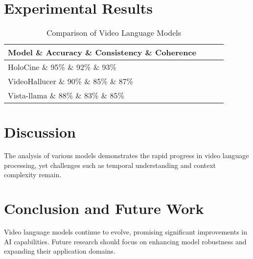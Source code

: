 \documentclass{article}
\begin{document}
\section{Experimental Results}
\begin{table}[h]
\centering
\caption{Comparison of Video Language Models}
\begin{tabular}{lccc}
\toprule
Model \& Accuracy \& Consistency \& Coherence \\
\midrule
HoloCine \& 95\% \& 92\% \& 93\% \\
VideoHallucer \& 90\% \& 85\% \& 87\% \\
Vista-llama \& 88\% \& 83\% \& 85\% \\
\bottomrule
\end{tabular}
\end{table}
\section{Discussion}
The analysis of various models demonstrates the rapid progress in video language processing, yet challenges such as temporal understanding and context complexity remain.
\section{Conclusion and Future Work}
Video language models continue to evolve, promising significant improvements in AI capabilities. Future research should focus on enhancing model robustness and expanding their application domains.


\end{document}
